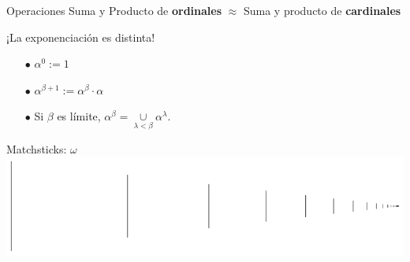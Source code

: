 \documentclass[10pt,spanish]{beamer}
\def\N{\mathbb{N}}
\begin{document}
\begin{frame}{Operaciones}
	Suma y Producto de \textbf{ordinales} $\approx$ Suma y producto de \textbf{cardinales} \pause




	
	
	¡La exponenciación es distinta!






	
	\begin{itemize}
		\item[$\bullet$]$\alpha^0:= 1$
		\item[$\bullet$]$\alpha^{\beta + 1} := \alpha^\beta \cdot \alpha$
		\item[$\bullet$]Si $\beta$ es límite, $\alpha^\beta = \underset{\lambda < \beta}{\cup} \alpha^\lambda$.
	\end{itemize}
	
\end{frame}


\begin{frame}{Matchsticks: $\omega$}
\includegraphics[scale=0.4]{w.png}
\end{frame}
\end{document}
